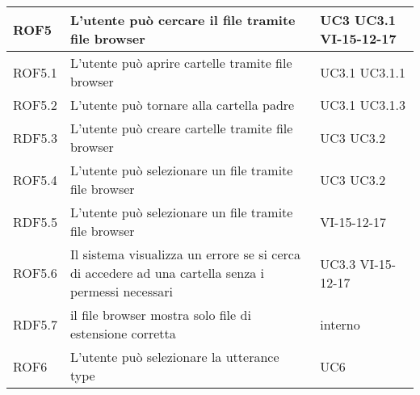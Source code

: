\documentclass[../AnalisideiRequisiti.tex]{subfiles}
\begin{document}
\begin{longtable}{| p{3cm} | p{6cm} | p{3cm} |}
		\newline ROF5&
		\newline L'utente può cercare il file tramite file browser&
		\newline UC3 \newline UC3.1 \newline VI-15-12-17
		\\[1em]
		\hline
		
			\newline ROF5.1&
		\newline L'utente può aprire cartelle tramite file browser&
		\newline UC3.1 \newline UC3.1.1
		\\[1em]
		\hline
		
		\newline ROF5.2&
		\newline L'utente può tornare alla cartella padre&
		\newline UC3.1 \newline UC3.1.3
		\\[1em]
		\hline
		
		\newline RDF5.3&
		\newline L'utente può creare cartelle tramite file browser&
		\newline UC3 \newline UC3.2
		\\[1em]
		\hline
		
		\newline ROF5.4&
		\newline L'utente può selezionare un file tramite file browser&
		\newline UC3 \newline UC3.2
		\\[1em]	
		\hline
		
		\newline RDF5.5&
		\newline L'utente può selezionare un file tramite file browser&
		\newline VI-15-12-17
		\\[1em]	
		\hline
		
		\newline ROF5.6&
		\newline Il sistema visualizza un errore se si cerca di accedere ad una cartella senza i permessi necessari&
		\newline UC3.3 \newline VI-15-12-17
		\\[1em]	
		\hline
		\newline RDF5.7&
		\newline il file browser mostra solo file di estensione corretta&
		\newline interno
		\\[1em]
		\hline
		\newline ROF6&
		\newline L'utente può selezionare la utterance type&
		\newline UC6 
		\\[1em]
		\hline
				

\end{longtable}
\end{document}
